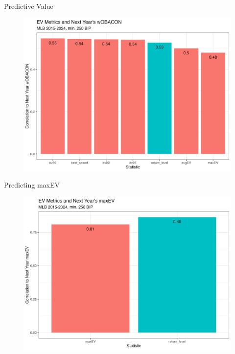 \documentclass{beamer}
\begin{document}
\begin{frame}{Predictive Value}
    \begin{figure}
        \centering
        \includegraphics[width=0.85\linewidth]{plots/woba_next_correlation.png}
    \end{figure}
\end{frame}

\begin{frame}{Predicting maxEV}
    \begin{figure}
        \centering
        \includegraphics[width=0.85\linewidth]{plots/maxev_next_correlation.png}
    \end{figure}
\end{frame}
\end{document}

